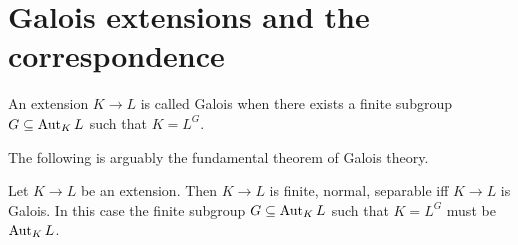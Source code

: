 \documentclass{article}
\begin{document}


\section{Galois extensions and the correspondence}

\begin{dfn}
  An extension $K \to L$ is called Galois
  when there exists a finite subgroup $G \subseteq \operatorname{Aut}_K L$
  such that $K = L^G$.
\end{dfn}

The following is arguably the fundamental theorem of Galois theory.

\begin{prop}
  Let $K \to L$ be an extension.
  Then $K \to L$ is finite, normal, separable
  iff $K \to L$ is Galois.
  In this case the finite subgroup $G \subseteq \operatorname{Aut}_K L$ such that $K = L^G$
  must be $\operatorname{Aut}_K L$.
\end{prop}


  


\end{document}
